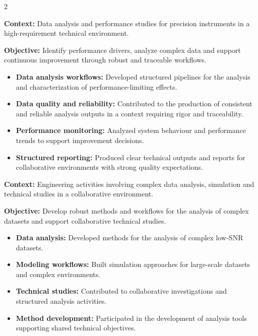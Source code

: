 \documentclass[8pt,a4paper,ragged2e,withhyper]{../_shared/altacv}
\begin{document}
\begin{paracol}{2}
\divider


\textbf{Context:} Data analysis and performance studies for precision instruments in a high-requirement technical environment.

\textbf{Objective:} Identify performance drivers, analyze complex data and support continuous improvement through robust and traceable workflows.

\begin{itemize}
\item \textbf{Data analysis workflows:} Developed structured pipelines for the analysis and characterization of performance-limiting effects.
\item \textbf{Data quality and reliability:} Contributed to the production of consistent and reliable analysis outputs in a context requiring rigor and traceability.
\item \textbf{Performance monitoring:} Analyzed system behaviour and performance trends to support improvement decisions.
\item \textbf{Structured reporting:} Produced clear technical outputs and reports for collaborative environments with strong quality expectations.
\end{itemize}

\vspace{2cm}

\textbf{Context:} Engineering activities involving complex data analysis, simulation and technical studies in a collaborative environment.

\textbf{Objective:} Develop robust methods and workflows for the analysis of complex datasets and support collaborative technical studies.

\begin{itemize}
\item \textbf{Data analysis:} Developed methods for the analysis of complex low-SNR datasets.
\item \textbf{Modeling workflows:} Built simulation approaches for large-scale datasets and complex environments.
\item \textbf{Technical studies:} Contributed to collaborative investigations and structured analysis activities.
\item \textbf{Method development:} Participated in the development of analysis tools supporting shared technical objectives.
\end{itemize}


\end{paracol}
\end{document}
